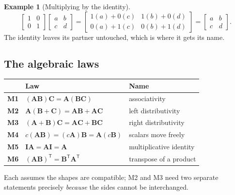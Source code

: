 \documentclass[11pt]{article}
\theoremstyle{plain}
\theoremstyle{definition}
\newtheorem{ex}{Example}[section]
\theoremstyle{remark}
\newcommand{\mt}[1]{\mathbf{#1}}        %
\newcommand{\T}{^{\mathsf{T}}}          %
\begin{document}
\begin{ex}[Multiplying by the identity]
\[
  \begin{bmatrix}1&0\\0&1\end{bmatrix}
  \begin{bmatrix}a&b\\c&d\end{bmatrix}
  =\begin{bmatrix}1(a)+0(c) & 1(b)+0(d)\\ 0(a)+1(c) & 0(b)+1(d)\end{bmatrix}
  =\begin{bmatrix}a&b\\c&d\end{bmatrix} .
\]
The identity leaves its partner untouched, which is where it gets its name.
\end{ex}

\subsection{The algebraic laws}
\begin{center}
\renewcommand{\arraystretch}{1.45}
\begin{tabular}{@{}l l l@{}}
\toprule
 & \textbf{Law} & \textbf{Name} \\
\midrule
\textbf{M1} & $(\mt{A}\mt{B})\mt{C}=\mt{A}(\mt{B}\mt{C})$
            & associativity \\
\textbf{M2} & $\mt{A}(\mt{B}+\mt{C})=\mt{A}\mt{B}+\mt{A}\mt{C}$
            & left distributivity \\
\textbf{M3} & $(\mt{A}+\mt{B})\mt{C}=\mt{A}\mt{C}+\mt{B}\mt{C}$
            & right distributivity \\
\textbf{M4} & $c(\mt{A}\mt{B})=(c\mt{A})\mt{B}=\mt{A}(c\mt{B})$
            & scalars move freely \\
\textbf{M5} & $\mt{I}\mt{A}=\mt{A}\mt{I}=\mt{A}$
            & multiplicative identity \\
\textbf{M6} & $(\mt{A}\mt{B})\T=\mt{B}\T\mt{A}\T$
            & transpose of a product \\
\bottomrule
\end{tabular}
\end{center}

\noindent Each assumes the shapes are compatible; M2 and M3 need two separate
statements precisely \emph{because} the sides cannot be interchanged.
\end{document}
